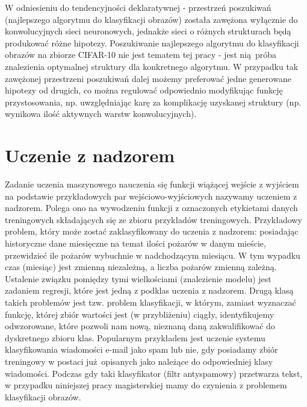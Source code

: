 W odniesieniu do tendencyjności deklaratywnej - przestrzeń poszukiwań (najlepszego algorytmu do klasyfikacji obrazów) została zawężona wyłącznie do konwolucyjnych sieci neuronowych, jednakże sieci o różnych strukturach będą produkować różne hipotezy.
Poszukiwanie najlepszego algorytmu do klasyfikacji obrazów na zbiorze CIFAR-10 nie jest tematem tej pracy - jest nią próba znalezienia optymalnej struktury dla konkretnego algorytmu.
W przypadku tak zawężonej przestrzeni poszukiwań dalej możemy preferować jedne generowane hipotezy od drugich, co można regulować odpowiednio modyfikując funkcję przystosowania, np. uwzględniając karę za komplikację uzyskanej struktury (np. wynikowa ilość aktywnych warstw konwolucyjnych).
\section{Uczenie z nadzorem}\label{supervised_learning}
Zadanie uczenia maszynowego nauczenia się funkcji wiążącej wejście z wyjściem na podstawie przykładowych par wejściowo-wyjściowych nazywamy uczeniem z nadzorem. \cite{russell2010artificial}
Polega ono na wywodzeniu funkcji z oznaczonych etykietami danych treningowych składających się ze zbioru przykładów treningowych. \cite{mohri2012foundations}
Przykładowy problem, który może zostać zaklasyfikowany do uczenia z nadzorem: posiadając historyczne dane miesięczne na temat ilości pożarów w danym mieście, przewidzieć ile pożarów wybuchnie w nadchodzącym miesiącu.
W tym wypadku czas (miesiąc) jest zmienną niezależną, a liczba pożarów zmienną zależną. Ustalenie związku pomiędzy tymi wielkościami (znalezienie modelu) jest zadaniem regresji, które jest jedną z podklas uczenia z nadzorem.
Drugą klasą takich problemów jest tzw. problem klasyfikacji, w którym, zamiast wyznaczać funkcję, której zbiór wartości jest (w przybliżeniu) ciągły, identyfikujemy odwzorowane, które pozwoli nam nową, nieznaną daną zakwalifikować do dyskretnego zbioru klas.
Popularnym przykładem jest uczenie systemu klasyfikowania wiadomości e-mail jako spam lub nie, gdy posiadamy zbiór treningowy w postaci już opisanych jako należące do odpowiedniej klasy wiadomości.
Podczas gdy taki klasyfikator (filtr antyspamowy) przetwarza tekst, w przypadku niniejszej pracy magisterskiej mamy do czynienia z problemem klasyfikacji obrazów.
